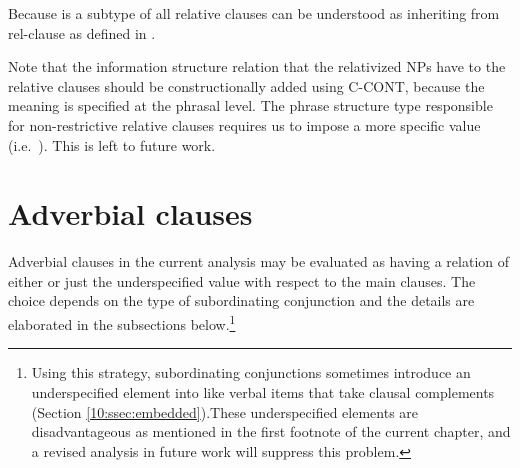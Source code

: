 


Because  is a subtype of  all
relative clauses can be understood as inheriting from rel-clause as
defined in .




\noindent Note that the information structure relation that the
relativized NPs have to the relative clauses should be
constructionally added using C-CONT, because the meaning is specified
at the phrasal level.  The phrase structure type responsible for
non-restrictive relative clauses requires us to impose a more specific
value (i.e.\ ). This is left to future work.



\largerpage[-1]
\section{Adverbial clauses}
\label{10:ssec:adjunct}

Adverbial clauses in the current analysis may be evaluated as having a
relation of either  or just the underspecified value
 with respect to the main clauses.  The choice depends
on the type of subordinating conjunction and the details are
elaborated in the subsections below.\footnote{Using this strategy,
  subordinating conjunctions sometimes introduce an underspecified
   element into  like verbal items that take
  clausal complements (Section \ref{10:ssec:embedded}).These underspecified
  elements are disadvantageous as mentioned in the first footnote of
  the current chapter, and a revised analysis in future work will
  suppress this problem.}


